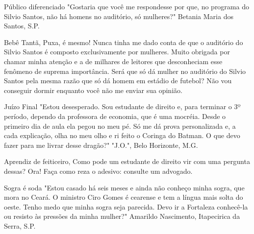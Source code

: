 Público diferenciado
"Gostaria que você me respondesse por que, no programa do Silvio Santos, não há homens no auditório, só mulheres?"
Betania Maria dos Santos, S.P.

Bebê Tantã,
Puxa, é mesmo! Nunca tinha me dado conta de que o auditório do Silvio Santos é composto exclusivamente por mulheres. Muito obrigada por chamar minha atenção e a de milhares de leitores que desconheciam esse fenômeno de suprema importância. Será que só dá mulher no auditório do Silvio Santos pela mesma razão que só dá homem em estádio de futebol? Não vou conseguir dormir enquanto você não me enviar sua opinião.

Juízo Final
"Estou desesperado. Sou estudante de direito e, para terminar o 3º período, dependo da professora de economia, que é uma mocréia. Desde o primeiro dia de aula ela pegou no meu pé. Só me dá prova personalizada e, a cada explicação, olha no meu olho e ri feito o Coringa do Batman. O que devo fazer para me livrar desse dragão?"
"J.O.", Belo Horizonte, M.G.

Aprendiz de feiticeiro,
Como pode um estudante de direito vir com uma pergunta dessas? Ora! Faça como reza o adesivo: consulte um advogado.

Sogra é soda
"Estou casado há seis meses e ainda não conheço minha sogra, que mora no Ceará. O ministro Ciro Gomes é cearense e tem a língua mais solta do oeste. Tenho medo que minha sogra seja parecida. Devo ir a Fortaleza conhecê-la ou resisto às pressões da minha mulher?"
Amarildo Nascimento, Itapecirica da Serra, S.P.

